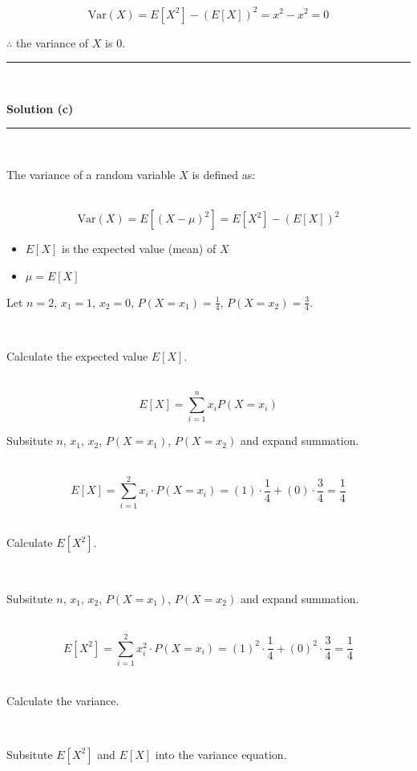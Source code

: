 \documentclass{article}
\begin{document}
$$\text{Var}(X) = E[X^2] - (E[X])^2 = x^2 - x^2 = 0$$

\parbox{\textwidth}{$\therefore$ the variance of $X$ is 0.}

\noindent\rule{\textwidth}{0.4pt}\\

\newpage

\textbf{Solution (c)}

\noindent\rule{\textwidth}{0.4pt}\\

\parbox{\textwidth}{The variance of a random variable $X$ is defined as:}\\

$$\text{Var}(X) = E[(X - \mu)^2] = E[X^2] - (E[X])^2$$

\begin{itemize}
    \item $E[X]$ is the expected value (mean) of $X$
    \item $\mu = E[X]$
\end{itemize}

\parbox{\textwidth}{Let $n = 2$, $x_1 = 1$, $x_2 = 0$, $P(X = x_1) = \frac{1}{4}$, $P(X = x_2) = \frac{3}{4}$.}\\

\parbox{\textwidth}{Calculate the expected value $E[X]$.}\\

$$E[X] = \sum^{n}_{i=1} x_i P(X = x_i)$$

\parbox{\textwidth}{Subsitute $n$, $x_1$, $x_2$, $P(X = x_1)$, $P(X = x_2)$ and expand summation.}\\

$$E[X] = \sum^2_{i=1} x_i \cdot P(X = x_i) = (1) \cdot \frac{1}{4} + (0) \cdot \frac{3}{4} = \frac{1}{4} $$\\

\parbox{\textwidth}{Calculate $E[X^2]$.}\\

\parbox{\textwidth}{Subsitute $n$, $x_1$, $x_2$, $P(X = x_1)$, $P(X = x_2)$ and expand summation.}\\

$$E[X^2] = \sum^2_{i=1} x_i^2 \cdot P(X = x_i) = (1)^2 \cdot \frac{1}{4} + (0)^2 \cdot \frac{3}{4} = \frac{1}{4}$$\\

\parbox{\textwidth}{Calculate the variance.}\\

\parbox{\textwidth}{Subsitute $E[X^2]$ and $E[X]$ into the variance equation.}\\
\end{document}
